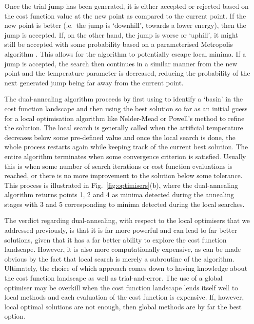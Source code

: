 Once the trial jump has been generated, it is either accepted or rejected based on the cost function value at the new point as compared to the current point. If the new point is better (\@i.e.~the jump is `downhill', towards a lower energy), then the jump is accepted. If, on the other hand, the jump is worse or `uphill', it might still be accepted with some probability based on a parameterised Metropolis algorithm \cite{chib_understanding_1995}. This allows for the algorithm to potentially escape local minima. If a jump is accepted, the search then continues in a similar manner from the new point and the temperature parameter is decreased, reducing the probability of the next generated jump being far away from the current point.

The dual-annealing algorithm proceeds by first using  to identify a `basin' in the cost function landscape and then using the best solution so far as an initial guess for a local optimisation algorithm like Nelder-Mead or Powell's method to refine the solution. The local search is generally called when the artificial temperature decreases below some pre-defined value and once the local search is done, the whole process restarts again while keeping track of the current best solution. The entire algorithm terminates when some convergence criterion is satisfied. Usually this is when some number of search iterations or cost function evaluations is reached, or there is no more improvement to the solution below some tolerance. This process is illustrated in Fig.~\ref{fig:optimisers}(b), where the dual-annealing algorithm returns points 1, 2 and 4 as minima detected during the annealing stages with 3 and 5 corresponding to minima detected during the local searches. 

The verdict regarding dual-annealing, with respect to the local optimisers that we addressed previously, is that it is far more powerful and can lead to far better solutions, given that it has a far better ability to explore the cost function landscape. However, it is also more computationally expensive, as can be made obvious by the fact that local search is merely a subroutine of the algorithm. Ultimately, the choice of which approach comes down to having knowledge about the cost function landscape as well as trial-and-error. The use of a global optimiser may be overkill when the cost function landscape lends itself well to local methods and each evaluation of the cost function is expensive. If, however, local optimal solutions are not enough, then global methods are by far the best option.

